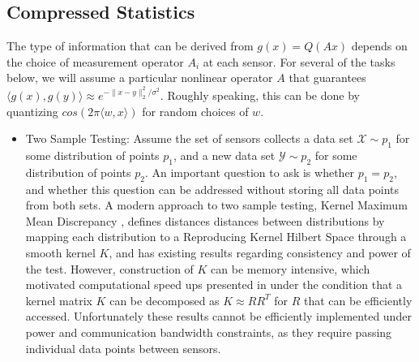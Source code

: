 \documentclass{article}
\begin{document}
\subsection{Compressed Statistics}
The type of information that can be derived from $g(x)=Q(Ax)$ depends on the choice of measurement operator $A_i$ at each sensor.  For several of the tasks below, we will assume a particular nonlinear operator $A$ that guarantees $\langle g(x), g(y) \rangle \approx e^{-\|x-y\|_2^2/\sigma^2}$.  Roughly speaking, this can be done by quantizing $cos(2\pi \langle w, x \rangle)$ for random choices of $w$.  
\begin{itemize}
\item Two Sample Testing: Assume the set of sensors collects a data set $\mathcal{X}\sim p_1$ for some distribution of points $p_1$, and a new data set $\mathcal{Y}\sim p_2$ for some distribution of points $p_2$.  An important question to ask is whether $p_1=p_2$, and whether this question can be addressed without storing all data points from both sets.  A modern approach to two sample testing, Kernel Maximum Mean Discrepancy \cite{Gretton 2012}, defines distances distances between distributions by mapping each distribution to a Reproducing Kernel Hilbert Space through a smooth kernel $K$, and has existing results regarding consistency and power of the test.  However, construction of $K$ can be memory intensive, which motivated computational speed ups presented in \cite{Cheng, Cloninger, Coifman 2017} under the condition that a kernel matrix $K$ can be decomposed as $K\approx RR^T$ for $R$ that can be efficiently accessed.  Unfortunately these results cannot be efficiently implemented under power and communication bandwidth constraints, as they require passing individual data points between sensors.  


\end{itemize}
\end{document}
